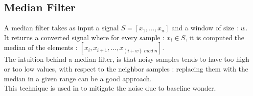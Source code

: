 \documentclass[LaM,binding=0.6cm]{sapthesis}
\begin{document}
\subsection{Median Filter}
A median filter takes as input a signal $S = [x_1 , \dots , x_n]$ and a window of size : $w$.\\It returns a converted signal where for every sample : $x_i \in S$, it is computed the median of the elements : $[x_i, x_{i+1}, \dots , x_{(i+w) \; mod \; n}]$.\\The intuition behind a median filter, is that noisy samples tends to have too high or too low values, with respect to the neighbor samples : replacing them with the median in a given range can be a good approach.\\This technique is used in \cite{rfdwt} to mitigate the noise due to baseline wonder.
\end{document}
